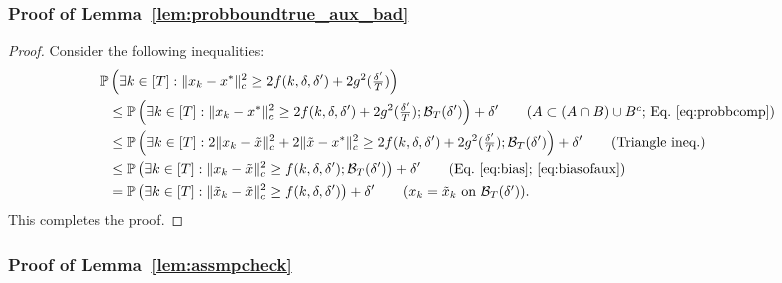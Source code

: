 \documentclass{article}
\newcommand{\lrp}[1]{\left( #1 \right)}
\newcommand{\xk}{x_k}
\begin{document}
\subsubsection{Proof of Lemma~\ref{lem:probboundtrue_aux_bad}}\label{app:proof_lem:probboundtrue_aux_bad}
\begin{proof}
Consider the following inequalities: 
\begin{align*}
    \mathbb{P}&\lrp{ \exists k \in [T]: \|x_k - x^*\|^2_c \ge 2 f(k, \delta, \delta') + 2g^2(\tfrac{\delta'}{T}) }\\
    &\le \mathbb{P}\lrp{ \exists k\in [T]: \|x_k - x^*\|^2_c \ge 2 f(k, \delta, \delta') + 2g^2(\tfrac{\delta'}{T}); \mathcal B_T(\delta') } + \delta' \tag{$A \subset (A\cap B) \cup B^c$; Eq.~\eqref{eq:probbcomp}} \\
    &\le \mathbb{P}\lrp{ \exists k\in [T]: 2\|x_k - \tilde{x} \|^2_c + 2\| \tilde{x} - x^*\|^2_c \ge 2 f(k, \delta, \delta') + 2g^2(\tfrac{\delta'}{T}); \mathcal B_T(\delta') } + \delta' \tag{Triangle ineq.} \\ 
    &\le \mathbb{P}\lrp{ \exists k\in [T]: \|x_k - \tilde{x} \|^2_c \ge f(k, \delta, \delta'); \mathcal B_T(\delta') } + \delta' \tag{Eq.~\eqref{eq:bias};~\eqref{eq:biasofaux}} \\ 
    &= \mathbb{P}\lrp{ \exists k\in [T]: \|\tilde{x}_k - \tilde{x} \|^2_c \ge f(k, \delta, \delta') } + \delta'\tag{$\xk = \tilde{x}_k$ on $\mathcal B_T(\delta')$}.
\end{align*}
This completes the proof.
\end{proof}



\subsubsection{Proof of  Lemma~\ref{lem:assmpcheck}}\label{app:proof_lem_assmpcheck}
\end{document}
